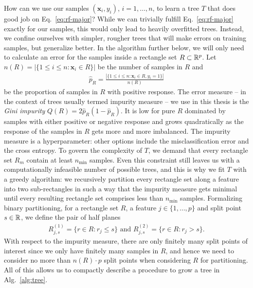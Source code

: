 How can we use our samples $(\mathbf{x}_i, y_i)$, $i = 1, \ldots, n$, to learn a tree $T$ that does 
good job on Eq.\ \eqref{eq:rf-major}? While we can 
trivially fulfill Eq.\ \eqref{eq:rf-major} exactly for our samples, this would only lead to heavily
overfitted trees. Instead, we confine ourselves with simpler, rougher trees that will make errors on 
training samples, but generalize better. 
In the algorithm further below, we will only need to calculate an error for the samples inside a 
rectangle set $R \subset \mathbb{R}^p$. Let $n(R) = |\{ 1 \leq i \leq n: \mathbf{x}_i \in R \}|$ be the number of 
samples in $R$ and
\begin{align}
    \hat{p}_R = \frac{|\{ 1 \leq i \leq n: \mathbf{x}_i \in R, y_i = 1 \}|}{n(R)}
\end{align}
be the proportion of samples in $R$ with positive response. The error measure -- in the context of 
trees usually termed impurity measure -- we use in this thesis
is the \textit{Gini impurity} $Q(R) = 2 \hat{p}_R (1 - \hat{p}_R)$. It is low for pure $R$ dominated by 
samples with either positive or negative response and grows quadratically as the response of the 
samples in $R$ gets more and more imbalanced. The impurity measure is a hyperparameter: other 
options include the misclassification error and the cross entropy. To govern the complexity of $T$,
we demand that every rectangle set $R_m$ contain at least $n_\text{min}$ samples. Even this 
constraint still leaves us with a computationally infeasible number of possible trees, and this is 
why we fit $T$ with a greedy algorithm: we recursively partition every rectangle set along a 
feature into two sub-rectangles in such a way that the impurity measure gets minimal until every resulting 
rectangle set comprises less than $n_\text{min}$ samples. Formalizing binary partitioning, for a 
rectangle set $R$, a feature $j \in \{1, \ldots, p\}$ and split point $s \in \mathbb{R}$, we define 
the pair of half planes
\begin{align}
    R^{(1)}_{j, s} = \{r \in R: r_j \leq s\} \text{ and } R^{(2)}_{j, s} = \{r \in R: r_j > s\}.
\end{align}
With respect to the impurity measure, there are only finitely many split points of interest since 
we only have finitely many samples in $R$, and hence we need to consider no more than $n(R) \cdot p$ split 
points when 
considering $R$ for partitioning. All of this allows us to compactly describe a procedure to grow a 
tree in Alg.\ \ref{alg:tree}.


